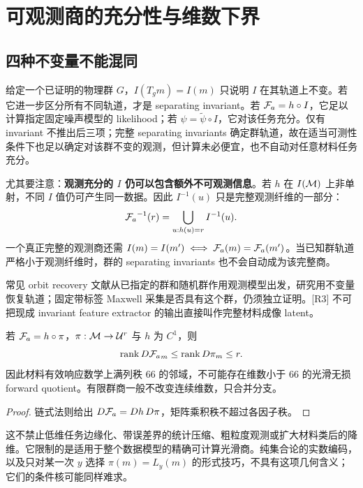 \section{可观测商的充分性与维数下界}

\subsection{四种不变量不能混同}

给定一个已证明的物理群 $G$，$I(T_gm)=I(m)$ 只说明 $I$ 在其轨道上不变。若它进一步区分所有不同轨道，才是 separating invariant。若 ${\mathcal F_a}=h\circ I$，它足以计算指定固定噪声模型的 likelihood；若 $\psi=\widetilde\psi\circ I$，它对该任务充分。仅有 invariant 不推出后三项；完整 separating invariants 确定群轨道，故在适当可测性条件下也足以确定对该群不变的观测，但计算未必便宜，也不自动对任意材料任务充分。

尤其要注意：\textbf{观测充分的 $I$ 仍可以包含额外不可观测信息}。若 $h$ 在 $I(\mathcal M)$ 上非单射，不同 $I$ 值仍可产生同一数据。因此 $I^{-1}(u)$ 只是完整观测纤维的一部分：
\begin{equation}
{\mathcal F_a}^{-1}(r)=\bigcup_{u:h(u)=r}I^{-1}(u).
\end{equation}
一个真正完整的观测商还需 $I(m)=I(m')\iff{\mathcal F_a}(m)={\mathcal F_a}(m')$。当已知群轨道严格小于观测纤维时，群的 separating invariants 也不会自动成为该完整商。

常见 orbit recovery 文献从已指定的群和随机群作用观测模型出发，研究用不变量恢复轨道；固定带标签 Maxwell 采集是否具有这个群，仍须独立证明。[R3] 不可把现成 invariant feature extractor 的输出直接叫作完整材料成像 latent。

\begin{proposition}[光滑无损商的维数下界]
若 ${\mathcal F_a}=h\circ\pi$，$\pi:\mathcal M\to\mathcal U^r$ 与 $h$ 为 $C^1$，则
\begin{equation}
\operatorname{rank} D{\mathcal F_a}_m\le\operatorname{rank} D\pi_m\le r.
\end{equation}
因此材料有效响应数学上满列秩 66 的邻域，不可能存在维数小于 66 的光滑无损 forward quotient。有限群商一般不改变连续维数，只合并分支。
\end{proposition}
\begin{proof}
链式法则给出 $D{\mathcal F_a}=Dh\,D\pi$，矩阵乘积秩不超过各因子秩。
\end{proof}

这不禁止低维任务边缘化、带误差界的统计压缩、粗粒度观测或扩大材料类后的降维。它限制的是适用于整个数据模型的精确可计算光滑商。纯集合论的实数编码，以及只对某一次 $y$ 选择 $\pi(m)=L_y(m)$ 的形式技巧，不具有这项几何含义；它们的条件核可能同样难求。

